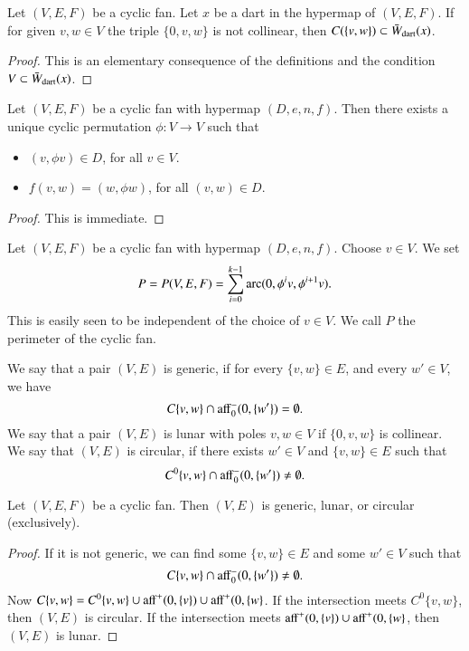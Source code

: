 \begin{lemma}  Let $(V,E,F)$ be a cyclic fan.  Let $x$ be a dart in the hypermap of $(V,E,F)$.  If for given $v,w\in V$  the triple $\{0,v,w\}$ is not collinear, then $C(\{v,w\}) \subset \bar W_{\text{dart}}(x)$.
\end{lemma}

\begin{proof}  This is an elementary consequence of the definitions and the condition $V\subset \bar W_{\text{dart}}(x)$.
\end{proof}

\begin{lemma}  Let $(V,E,F)$ be a cyclic fan with hypermap $(D,e,n,f)$.  Then there exists a unique cyclic permutation $\phi:V\to V$ such that
\begin{itemize}
\item $(v,\phi v)\in D$, for all $v\in V$.
\item $f(v,w) = (w,\phi w)$, for all $(v,w)\in D$.
\end{itemize}
\end{lemma}

\begin{proof}  This is immediate.
\end{proof}

\begin{definition}[perimeter]\label{lemma:mono}
Let $(V,E,F)$ be a cyclic fan with hypermap $(D,e,n,f)$.  Choose $v\in V$.  We set
$$
P=P(V,E,F) = \sum_{i=0}^{k-1} \operatorname{arc}(0,\phi^i v,\phi^{i+1} v).
$$
This is easily seen to be independent of the choice of $v\in V$.  We call $P$ the perimeter of the cyclic fan.
\end{definition}

\begin{definition}
We say that a pair $(V,E)$ is generic, if for every $\{v,w\}\in E$,
and every $w'\in V$, we have
$$
C\{v,w\}\cap {\operatorname{aff}}_0^-(0,\{w'\}) = \emptyset.
$$
We say that a pair $(V,E)$ is lunar with poles $v,w\in V$ if $\{0,v,w\}$ is collinear.
We say that $(V,E)$ is circular, if there exists $w'\in V$ and $\{v,w\}\in E$ such that 
$$
C^0\{v,w\}\cap {\operatorname{aff}}_0^-(0,\{w'\})\ne \emptyset.
$$
\end{definition}

\begin{lemma} Let $(V,E,F)$ be a cyclic fan.  Then $(V,E)$ is
generic, lunar, or circular (exclusively).
\end{lemma}

\begin{proof} If it is not generic, we can find some $\{v,w\}\in E$
and some $w'\in V$ such that
$$
C\{v,w\}\cap {\operatorname{aff}}_0^-(0,\{w'\}) \ne \emptyset.
$$
Now $C\{v,w\} = C^0\{v,w\} \cup{\operatorname{aff}}^+(0,\{v\})\cup{\operatorname{aff}}^+(0,\{w\}$.  
If the intersection meets $C^0\{v,w\}$, then $(V,E)$ is circular.  
If the intersection meets ${\operatorname{aff}}^+(0,\{v\})\cup{\operatorname{aff}}^+(0,\{w\}$,
then $(V,E)$ is lunar. 
\end{proof}

